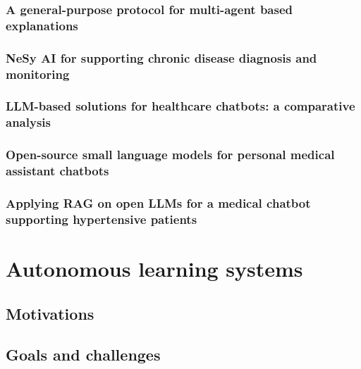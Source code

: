 \documentclass[12pt,a4paper,openright,twoside]{book}
\begin{document}
\subsection{A general-purpose protocol for multi-agent based explanations}\label{subsec:a-general-purpose-protocol-for-multi-agent-based-explanations}

\subsection{\Acl{NeSy} \ac{AI} for supporting chronic disease diagnosis and monitoring}\label{subsec:nesy-ai-for-supporting-chronic-disease-diagnosis-and-monitoring}

\subsection{\Ac{LLM}-based solutions for healthcare chatbots: a comparative analysis}\label{subsec:llm-based-solutions-for-healthcare-chatbots-a-comparative-analysis}

\subsection{Open-source small language models for personal medical assistant chatbots}\label{subsec:open-source-small-language-models-for-personal-medical-assistant-chatbots}

\subsection{Applying \acl{RAG} on open \acp{LLM} for a medical chatbot supporting hypertensive patients}\label{subsec:applying-rag-on-open-llm-for-a-medical-chatbot-supporting-hypertensive-patients}


\chapter{Autonomous learning systems}\label{ch:autonomous-learning-systems}

\section{Motivations}\label{sec:motivations}

\section{Goals and challenges}\label{sec:goals-and-challenges}
\end{document}
